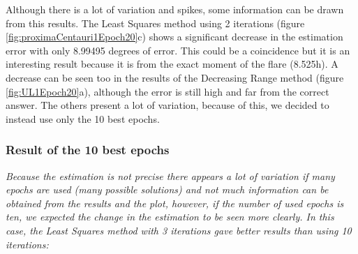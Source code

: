 Although there is a lot of variation and spikes, some information can be drawn from this results. The Least Squares method using 2 iterations (figure \ref{fig:proximaCentauri1Epoch20}c) shows a significant decrease in the estimation error with only 8.99495 degrees of error. This could be a coincidence but it is an interesting result because it is from the exact moment of the flare (8.525h). A decrease can be seen too in the results of the Decreasing Range method (figure \ref{fig:UL1Epoch20}a), although the error is still high and far from the correct answer. The others present a lot of variation, because of this, we decided to instead use only the 10 best epochs.

\clearpage

\subsubsection{Result of the 10 best epochs}

\textit{Because the estimation is not precise there appears a lot of variation if many epochs are used (many possible solutions) and not much information can be obtained from the results and the plot, however, if the number of used epochs is ten, we expected the change in the estimation to be seen more clearly. In this case, the Least Squares method with 3 iterations gave better results than using 10 iterations:}

